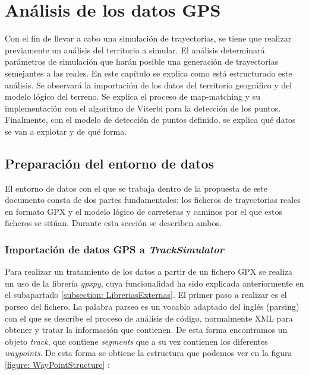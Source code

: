 \chapter{Análisis de los datos \ac{GPS}}  \label{chapter:DataAnalysis}
Con el fin de llevar a cabo una simulación de trayectorias, se tiene que realizar previamente
un análisis del territorio a simular. El análisis determinará parámetros de simulación que 
harán posible una generación de trayectorias semejantes a las reales. En este capítulo 
se explica como está estructurado este análisis. Se observará la importación de los datos
del territorio geográfico y del modelo lógico del terreno. Se explica el proceso de 
map-matching y su implementación con el algoritmo de Viterbi para la detección de los 
puntos. Finalmente, con el modelo de detección de puntos definido, se explica qué 
datos se van a explotar y de qué forma.


\section{Preparación del entorno de datos}
El entorno de datos con el que se trabaja dentro de la propuesta de este documento 
consta de dos partes fundamentales: los ficheros de trayectorias reales en formato
\ac{GPX} y el modelo lógico de carreteras y caminos por el que estos ficheros 
se sitúan. Durante esta sección se describen ambos.

\subsection{Importación de datos GPS a \textit{TrackSimulator}}
\label{section: ImportacionGPX}
Para realizar un tratamiento de los datos a partir de un fichero GPX se realiza un uso de la 
librería \textit{gpxpy}, cuya funcionalidad ha sido explicada anteriormente en el subapartado 
\ref{subsection: LibreriasExternas}. El primer paso a realizar es el parseo del fichero. 
La palabra parseo es un vocablo adaptado del inglés (parsing) con el que se describe el proceso 
de análisis de código, normalmente XML para obtener y tratar la información que contienen.
De esta forma encontramos un objeto \textit{track}, que contiene \textit{segments} que a su vez 
contienen los diferentes \textit{waypoints}. De esta
forma se obtiene la estructura que podemos ver en la figura \ref{figure: WayPointStructure} :

